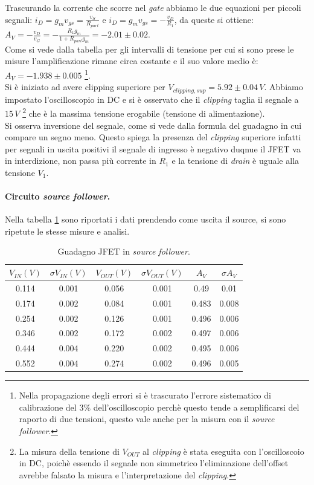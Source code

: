 \documentclass[10pt,a4paper]{article}
\begin{document}
Trascurando la corrente che scorre nel \emph{gate} abbiamo le due equazioni per piccoli segnali: $i_D = g_m v_{gs} = \frac{v_S}{R_{part}}$ e $i_D = g_m v_{gs} = -\frac{v_D}{R_1}$, da queste si ottiene: $A_V = -\frac{v_D}{v_G} = - \frac{R_1 g_m}{1+R_{part} g_m} = -2.01\pm0.02$. \\
Come si vede dalla tabella per gli intervalli di tensione per cui si sono prese le misure l'amplificazione rimane circa costante e il suo valore medio è: $A_V = -1.938\pm0.005$ \footnote{Nella propagazione degli errori si è trascurato l'errore sistematico di calibrazione del  $3\%$ dell'oscilloscopio perchè questo tende a semplificarsi del raporto di due tensioni, questo vale anche per la misura con il \emph{source follower}.}. \\
Si è iniziato ad avere clipping superiore per $V_{clipping, sup} = 5.92\pm0.04 \, V$. Abbiamo impostato l'oscilloscopio in DC e si è osservato che il \emph{clipping} taglia il segnale a $15\,V$ \footnote{La misura della tensione di $V_{OUT}$ al \emph{clipping} è stata eseguita con l'oscilloscoio in DC, poichè essendo il segnale non simmetrico l'eliminazione dell'offset avrebbe falsato la misura e l'interpretazione del \emph{clipping}.} che è la massima tensione erogabile (tensione di alimentazione).\\
Si osserva inversione del segnale, come si vede dalla formula del guadagno in cui compare un segno meno. Questo spiega la presenza del \emph{clipping} superiore infatti per segnali in uscita positivi il segnale di ingresso è negativo duqnue il JFET va in interdizione, non passa più corrente in $R_1$ e la tensione di \emph{drain} è uguale alla tensione $V_1$. 
\paragraph{Circuito \emph{source follower}.}
Nella tabella \ref{tabellaSourceFollower} sono riportati i dati prendendo come uscita il source, si sono ripetute le stesse misure e analisi.

\begin{table}[!htb]\centering
\begin{tabular}{|c|c|c|c|c|c|}
\hline
$V_{IN} (V)$ & $\sigma V_{IN} (V)$ & $V_{OUT} (V)$ & $\sigma V_{OUT} (V)$ & $A_V$ & $\sigma A_V$\\
\hline
0.114 & 0.001 & 0.056 & 0.001 & 0.49 & 0.01\\
0.174 & 0.002 & 0.084 & 0.001 & 0.483 & 0.008\\
0.254 & 0.002 & 0.126 & 0.001 & 0.496 & 0.006\\
0.346 & 0.002 & 0.172 & 0.002 & 0.497 & 0.006\\
0.444 & 0.004 & 0.220 & 0.002 & 0.495 & 0.006\\
0.552 & 0.004 & 0.274 & 0.002 & 0.496 & 0.005\\
\hline
\end{tabular}
\caption{Guadagno JFET in \emph{source follower}.}
\label{tabellaSourceFollower}
\end{table}
\end{document}
